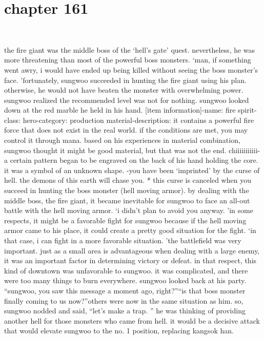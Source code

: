 \section{chapter 161}

                             




the fire giant was the middle boss of the ‘hell’s gate’ quest.
 nevertheless, he was more threatening than most of the powerful boss monsters.
‘man, if something went awry, i would have ended up being killed without seeing the boss monster’s face.
’fortunately, sungwoo succeeded in hunting the fire giant using his plan.
 otherwise, he would not have beaten the monster with overwhelming power.
sungwoo realized the recommended level was not for nothing.
sungwoo looked down at the red marble he held in his hand.
[item information]-name: fire spirit-class: hero-category: production material-description: it contains a powerful fire force that does not exist in the real world.
 if the conditions are met, you may control it through mana.
based on his experiences in material combination, sungwoo thought it might be good material, but that was not the end.
chiiiiiiiiiii-a certain pattern began to be engraved on the back of his hand holding the core.
it was a symbol of an unknown shape.
-you have been ‘imprinted’ by the curse of hell.
 the demons of this earth will chase you.
* this curse is canceled when you succeed in hunting the boss monster (hell moving armor).
by dealing with the middle boss, the fire giant, it became inevitable for sungwoo to face an all-out battle with the hell moving armor.
‘i didn’t plan to avoid you anyway.
’in some respects, it might be a favorable fight for sungwoo because if the hell moving armor came to his place, it could create a pretty good situation for the fight.
‘in that case, i can fight in a more favorable situation.
’the battlefield was very important.
 just as a small area is advantageous when dealing with a large enemy, it was an important factor in determining victory or defeat.
in that respect, this kind of downtown was unfavorable to sungwoo.
 it was complicated, and there were too many things to burn everywhere.
sungwoo looked back at his party.
“sungwoo, you saw this message a moment ago, right?”“is that boss monster finally coming to us now?”others were now in the same situation as him.
so, sungwoo nodded and said, “let’s make a trap.
”
he was thinking of providing another hell for those monsters who came from hell.
it would be a decisive attack that would elevate sungwoo to the no.
 1 position, replacing kangsok han.
